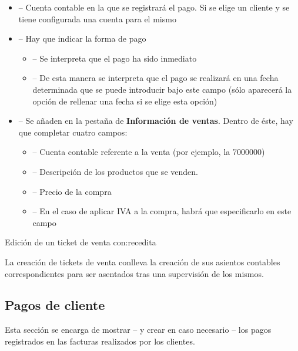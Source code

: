 \begin{itemize}

  \item[Cuenta] -- Cuenta contable en la que se registrará el pago. Si se elige un cliente y se tiene configurada una cuenta para el
          mismo
  \item[Pago] -- Hay que indicar la forma de pago
      \begin{itemize}
         \item[Pagar directamente] -- Se interpreta que el pago ha sido inmediato
         \item[Pagar tarde o agrupar fondos] -- De esta manera se interpreta que el pago se realizará en una fecha determinada que se puede
              introducir bajo este campo (sólo aparecerá la opción de rellenar una fecha si se elige esta opción)
      \end{itemize}

  \item[Elementos de la venta] -- Se añaden en la pestaña de \textbf{Información de ventas}. Dentro de éste, hay que completar cuatro
 campos:
      \begin{itemize}
         \item[Cuenta] -- Cuenta contable referente a la venta (por ejemplo, la 7000000)
         \item[Descripción] --  Descripción de los productos que se venden.
         \item[Importe] -- Precio de la compra
         \item[Impuesto] -- En el caso de aplicar IVA a la compra, habrá que especificarlo en este campo
      \end{itemize}
\end{itemize}



{Edición de un ticket de venta}
{con:recedita}


La creación de tickets de venta conlleva la creación de sus asientos contables correspondientes para ser asentados tras una supervisión de los mismos.




\subsection{Pagos de cliente}

Esta sección se encarga de mostrar -- y crear en caso necesario -- los pagos registrados en las facturas realizados por los clientes.

